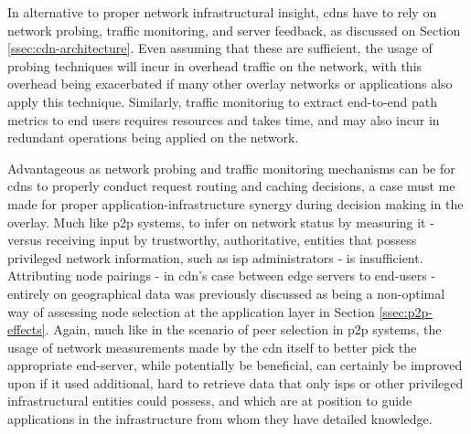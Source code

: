     In alternative to proper network infrastructural insight, \glspl{cdn} have to rely on network probing, traffic monitoring, and server feedback, as discussed on Section \ref{ssec:cdn-architecture}.
    Even assuming that these are sufficient, the usage of probing techniques will incur in overhead traffic on the network, with this overhead being exacerbated if many other overlay networks or applications also apply this technique.
    Similarly, traffic monitoring to extract end-to-end path metrics to end users requires resources and takes time, and may also incur in redundant operations being applied on the network.

    Advantageous as network probing and traffic monitoring mechanisms can be for \glspl{cdn} to properly conduct request routing and caching decisions, a case must me made for proper application-infrastructure synergy during decision making in the overlay.
    Much like \gls{p2p} systems, to infer on network status by measuring it - versus receiving input by trustworthy, authoritative, entities that possess privileged network information, such as \gls{isp} administrators - is insufficient.
    Attributing node pairings - in \gls{cdn}'s case between edge servers to end-users - entirely on geographical data was previously discussed as being a non-optimal way of assessing node selection at the application layer in Section \ref{ssec:p2p-effects}.
    Again, much like in the scenario of peer selection in \gls{p2p} systems, the usage of network measurements made by the \gls{cdn} itself to better pick the appropriate end-server, while potentially be beneficial, can certainly be improved upon if it used additional, hard to retrieve data that only \glspl{isp} or other privileged infrastructural entities could possess, and which are at position to guide applications in the infrastructure from whom they have detailed knowledge.

